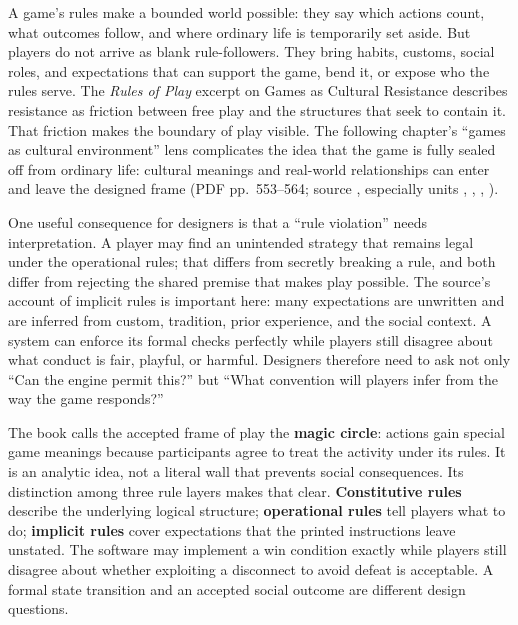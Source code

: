 \hypertarget{06-engine-ii-ch046-when-players-push-against-the-frame}{}

A game's rules make a bounded world possible: they say which actions count, what outcomes follow, and where ordinary life is temporarily set aside. But players do not arrive as blank rule-followers. They bring habits, customs, social roles, and expectations that can support the game, bend it, or expose who the rules serve. The \emph{Rules of Play} excerpt on Games as Cultural Resistance describes resistance as friction between free play and the structures that seek to contain it. That friction makes the boundary of play visible. The following chapter's ``games as cultural environment'' lens complicates the idea that the game is fully sealed off from ordinary life: cultural meanings and real-world relationships can enter and leave the designed frame (PDF pp.~553--564; source , especially units , , , ).

One useful consequence for designers is that a ``rule violation'' needs interpretation. A player may find an unintended strategy that remains legal under the operational rules; that differs from secretly breaking a rule, and both differ from rejecting the shared premise that makes play possible. The source's account of implicit rules is important here: many expectations are unwritten and are inferred from custom, tradition, prior experience, and the social context. A system can enforce its formal checks perfectly while players still disagree about what conduct is fair, playful, or harmful. Designers therefore need to ask not only ``Can the engine permit this?'' but ``What convention will players infer from the way the game responds?''

The book calls the accepted frame of play the \textbf{magic circle}: actions gain special game meanings because participants agree to treat the activity under its rules. It is an analytic idea, not a literal wall that prevents social consequences. Its distinction among three rule layers makes that clear. \textbf{Constitutive rules} describe the underlying logical structure; \textbf{operational rules} tell players what to do; \textbf{implicit rules} cover expectations that the printed instructions leave unstated. The software may implement a win condition exactly while players still disagree about whether exploiting a disconnect to avoid defeat is acceptable. A formal state transition and an accepted social outcome are different design questions.


